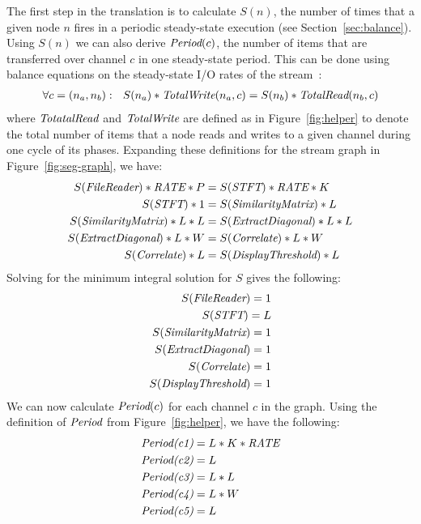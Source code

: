 The first step in the translation is to calculate $S(n)$, the number
of times that a given node $n$ fires in a periodic steady-state
execution (see Section~\ref{sec:balance}).  Using $S(n)$ we can also
derive $\mbox{\it Period}(c)$, the number of items that are transferred over
channel $c$ in one steady-state period.  This can be done using
balance equations on the steady-state I/O rates of the
stream~\cite{leesdf}:
{\scriptsize
\begin{align*}
\forall c = (n_a, n_b):~~S(n_a) * \mbox{\it TotalWrite}(n_a, c) 
  = S(n_b) * \mbox{\it TotalRead}(n_b, c)
\end{align*}}
where $\mbox{\it TotatalRead}$ and $\mbox{\it TotalWrite}$ are defined as in
Figure~\ref{fig:helper} to denote the total number of items that a
node reads and writes to a given channel during one cycle of its
phases.  Expanding these definitions for the stream graph in
Figure~\ref{fig:seg-graph}, we have:
{\scriptsize
\begin{align*}
S(\mbox{\it FileReader}) * \mbox{\it RATE}*P
  &= S(\mbox{\it STFT}) * \mbox{\it RATE}*K \\
S(\mbox{\it STFT}) * 1
  &= S(\mbox{\it SimilarityMatrix}) * L \\
S(\mbox{\it SimilarityMatrix}) * L * L
  &= S(\mbox{\it ExtractDiagonal}) * L * L \\
S(\mbox{\it ExtractDiagonal}) * L * W
  &= S(\mbox{\it Correlate}) * L * W \\
S(\mbox{\it Correlate}) * L 
  &= S(\mbox{\it DisplayThreshold}) * L
\end{align*}}
Solving for the minimum integral solution for $S$ gives the following:
{\scriptsize
\begin{align*}
S(\mbox{\it FileReader}) = 1 \\
S(\mbox{\it STFT}) = L \\
S(\mbox{\it SimilarityMatrix}) = 1 \\
S(\mbox{\it ExtractDiagonal}) = 1 \\
S(\mbox{\it Correlate}) = 1 \\
S(\mbox{\it DisplayThreshold}) = 1 \\
\end{align*}}
We can now calculate $\mbox{\it Period}(c)$ for each channel $c$ in the
graph.  Using the definition of $\mbox{\it Period}$ from
Figure~\ref{fig:helper}, we have the following:
{\scriptsize
\begin{align*}
\mbox{\it Period(c1)} &= L * K * \mbox{\it RATE}\\
\mbox{\it Period(c2)} &= L \\
\mbox{\it Period(c3)} &= L * L \\
\mbox{\it Period(c4)} &= L * W \\
\mbox{\it Period(c5)} &= L
\end{align*}}

